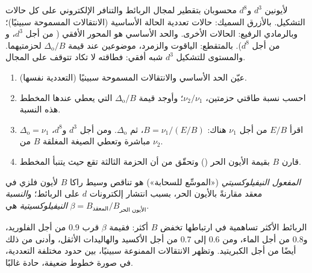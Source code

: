 \begin{omfigure}
{\small {} لأيونين $d^3$ و$d^8$ محسوبان بتقطير
 لمجال الربائط والتنافر الإلكتروني على كل حالات
التشكيل. بالأزرق السميك: حالات تعددية الحالة الأساسية
(الانتقالات المسموحة سبينيًا)؛ وبالرمادي الرفيع: الحالات الأخرى. والحد الأساسي هو
المحور الأفقي ( من أجل $d^3$، و من أجل $d^8$). بالمتقطع: الياقوت والزمرد، موضوعين عند قيمة $\Delta_{\mathrm o}/B$ لحزمتيهما.
والمستوى  للتشكيل $d^3$ شبه أفقي: فطاقته لا تكاد تتوقف على المجال.}
\end{omfigure}

\begin{method}\label{met:b3:complex-spectra-magnetism:read-ts}
\begin{enumerate}
  \item عيّن الحد الأساسي والانتقالات المسموحة سبينيًا (التعددية
        نفسها).
  \item احسب نسبة طاقتي حزمتين، $\nu_2/\nu_1$؛ وأوجد قيمة $\Delta_{\mathrm o}/B$ التي
        يعطي عندها المخطط هذه النسبة.
  \item اقرأ $E/B$ من أجل $\nu_1$ هناك: $B = \nu_1/(E/B)$، ثم $\Delta_{\mathrm o}$. ومن أجل $d^3$ و$d^8$، $\Delta_{\mathrm o} = \nu_1$
        مباشرة وتعطي الصيغة المغلقة $B$ من $\nu_2$.
  \item قارن $B$ بقيمة الأيون الحر () وتحقّق من أن
        الحزمة الثالثة تقع حيث يتنبأ المخطط.
\end{enumerate}
\end{method}

\begin{definition}\label{def:b3:complex-spectra-magnetism:nephelauxetic}
\emph{المفعول النيفيلوكسيتي} («الموسِّع للسحابة») هو
تناقص وسيط راكا $B$ لأيون فلزي في معقد مقارنةً
بالأيون الحر، بسبب انتشار إلكترونات $d$ على
الربائط؛ و\emph{النسبة النيفيلوكسيتية} هي $\beta =
B_{\text{المعقد}}/B_{\text{الأيون الحر}}$.
\end{definition}

الربائط الأكثر تساهمية في ارتباطها تخفض $B$ أكثر: فقيمة $\beta$ قرب 0.9 من أجل الفلوريد، و0.8
من أجل الماء، ومن 0.6 إلى 0.7 من أجل الأكسيد والهاليدات الأثقل، وأدنى من ذلك أيضًا من أجل الكبريتيد.
وتظهر الانتقالات الممنوعة سبينيًا، بين حدود مختلفة التعددية،
في صورة خطوط ضعيفة، حادة غالبًا.

